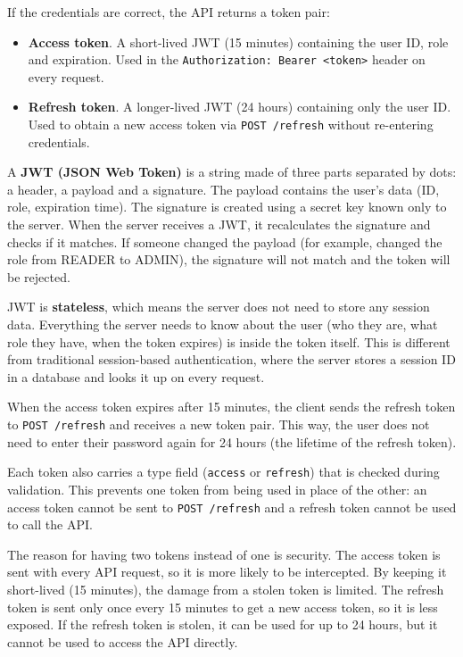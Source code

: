If the credentials are correct, the API returns a token pair:

\begin{itemize}
    \item \textbf{Access token}. A short-lived JWT (15 minutes) containing the user ID, role and expiration. Used in the \texttt{Authorization: Bearer <token>} header on every request.
    \item \textbf{Refresh token}. A longer-lived JWT (24 hours) containing only the user ID. Used to obtain a new access token via \texttt{POST /refresh} without re-entering credentials.
\end{itemize}

A \textbf{JWT (JSON Web Token)} is a string made of three parts separated by dots: a header, a payload and a signature. The payload contains the user's data (ID, role, expiration time). The signature is created using a secret key known only to the server. When the server receives a JWT, it recalculates the signature and checks if it matches. If someone changed the payload (for example, changed the role from READER to ADMIN), the signature will not match and the token will be rejected.

JWT is \textbf{stateless}, which means the server does not need to store any session data. Everything the server needs to know about the user (who they are, what role they have, when the token expires) is inside the token itself. This is different from traditional session-based authentication, where the server stores a session ID in a database and looks it up on every request.

When the access token expires after 15 minutes, the client sends the refresh token to \texttt{POST /refresh} and receives a new token pair. This way, the user does not need to enter their password again for 24 hours (the lifetime of the refresh token).

Each token also carries a type field (\texttt{access} or \texttt{refresh}) that is checked during validation. This prevents one token from being used in place of the other: an access token cannot be sent to \texttt{POST /refresh} and a refresh token cannot be used to call the API.

The reason for having two tokens instead of one is security. The access token is sent with every API request, so it is more likely to be intercepted. By keeping it short-lived (15 minutes), the damage from a stolen token is limited. The refresh token is sent only once every 15 minutes to get a new access token, so it is less exposed. If the refresh token is stolen, it can be used for up to 24 hours, but it cannot be used to access the API directly.

